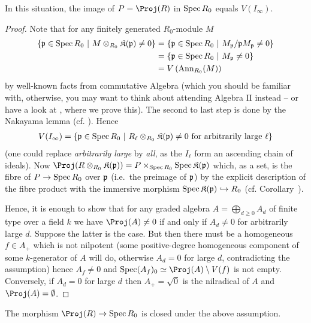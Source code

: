 \documentclass[a4paper,parskip=half,numbers=enddot, DIV=12]{scrreprt}
\begin{document}
\begin{prop}
    In this situation, the image of $P=\Proj(R)$ in $\operatorname{Spec} R_0$ equals $V(I_\infty)$.
\end{prop}
\begin{proof}
    Note that for any finitely generated $R_0$-module $M$ 
    \begin{align*}
        \left\{\mathfrak{p}\in \operatorname{Spec} R_0\ \middle|\  M\otimes_{R_0}\mathfrak{K}(\mathfrak{p})\neq 0\right\} &= \left\{\mathfrak{p}\in \operatorname{Spec} R_0 \ \middle|\  M_{\mathfrak{p}}/\mathfrak{p} M_{\mathfrak{p}} \neq 0\right\}\\
        &= \left\{\mathfrak{p}\in \operatorname{Spec} R_0\ \middle|\  M_{\mathfrak{p}}\neq 0\right\}\\
        &= V\left(\operatorname{Ann}_{R_0}(M)\right)
    \end{align*}
    by well-known facts from commutative Algebra (which you should be familiar with, otherwise, you may want to think about attending Algebra $\mathrm{II}$ instead -- or have a look at \cite[Lemma~3.4.1]{alg2}, where we prove this). The second to last step is done by the Nakayama lemma (cf. \cite[Proposition~1.2.3]{alg2}). Hence 
    \begin{align*}
        V(I_\infty) = \left\{\mathfrak{p}\in \operatorname{Spec} R_0\ \middle|\  R_\ell\otimes_{R_0} \mathfrak{K}(\mathfrak{p})\neq 0 \text{ for arbitrarily large } \ell\right\}
    \end{align*}
    (one could replace \emph{arbitrarily large} by \emph{all}, as the $I_\ell$ form an ascending chain of ideals). Now $\Proj(R\otimes_{R_0} \KK(\pp)) = P\times_{\Spec R_0} \Spec\KK(\pp)$ which, as a set, is the fibre of $P\morphism \Spec R_0$ over $\mathfrak{p}$ (i.e.\ the preimage of $\mathfrak{p}$) by the explicit description of the fibre product with the immersive morphism $\Spec \KK(\pp) \monomorphism R_0$ (cf. Corollary~). 
    
    Hence, it is enough to show that for any graded algebra $A=\bigoplus_{d\geq 0}A_d$ of finite type over a field $k$ we have $\Proj(A)\neq 0$ if and only if $A_d \neq 0$ for arbitrarily large $d$. Suppose the latter is the case. But then there must be a homogeneous $f\in A_+$ which is not nilpotent (some positive-degree homogeneous component of some $k$-generator of $A$ will do, otherwise $A_d=0$ for large $d$, contradicting the assumption) hence $A_f \neq 0$ and $\Spec(A_f)_0 \simeq \Proj(A)\setminus V(f)$ is not empty. Conversely, if $A_d = 0$ for large $d$ then $A_+ = \sqrt{0}$ is the nilradical of $A$ and $\Proj(A) = \emptyset$.
\end{proof}
\begin{cor}
    The morphism $\Proj(R) \morphism \Spec R_0$ is closed under the above assumption.
\end{cor}
\end{document}
